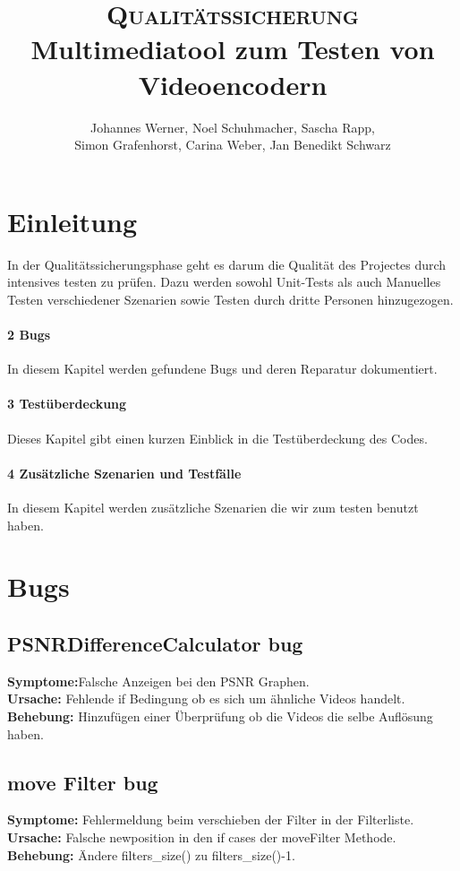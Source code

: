 \documentclass{scrartcl}
\title{\fontsize{40}{48} \selectfont \textsc{Qualitätssicherung}\\
{\fontsize{18}{18} \selectfont Multimediatool zum Testen von Videoencodern}}}
\author {Johannes Werner, Noel Schuhmacher, Sascha Rapp,\\ Simon Grafenhorst,
Carina Weber, Jan Benedikt Schwarz}
\begin{document}
 {
\maketitle
\thispagestyle{empty}
\pagestyle{empty}
\newpage
\setcounter{page}{0}
\tableofcontents
\clearpage
\pagestyle{plain}
\newpage
\section{Einleitung}
In der Qualitätssicherungsphase geht es darum die Qualität des Projectes  durch intensives testen zu prüfen. Dazu werden sowohl Unit-Tests als auch Manuelles Testen verschiedener Szenarien sowie Testen durch dritte Personen hinzugezogen.
\paragraph{2 Bugs} In diesem Kapitel werden gefundene Bugs und deren Reparatur dokumentiert.
\paragraph{3 Testüberdeckung} Dieses Kapitel gibt einen kurzen Einblick in die Testüberdeckung des Codes.
\paragraph{4 Zusätzliche Szenarien und Testfälle}
In diesem Kapitel werden zusätzliche Szenarien die wir zum testen benutzt haben.
\newpage
\section{Bugs}
\subsection{PSNRDifferenceCalculator bug}
\textbf{Symptome:}Falsche Anzeigen bei den PSNR Graphen.\\
\textbf{Ursache:} Fehlende if Bedingung ob es sich um ähnliche Videos handelt.\\
\textbf{Behebung:} Hinzufügen einer Überprüfung ob die Videos die selbe Auflösung haben.
\subsection{move Filter bug}
\textbf{Symptome:} Fehlermeldung beim verschieben der Filter in der Filterliste.\\
\textbf{Ursache:} Falsche newposition in den if cases der moveFilter Methode.\\
\textbf{Behebung:} Ändere filters\_size() zu filters\_size()-1.
}
\end{document}
